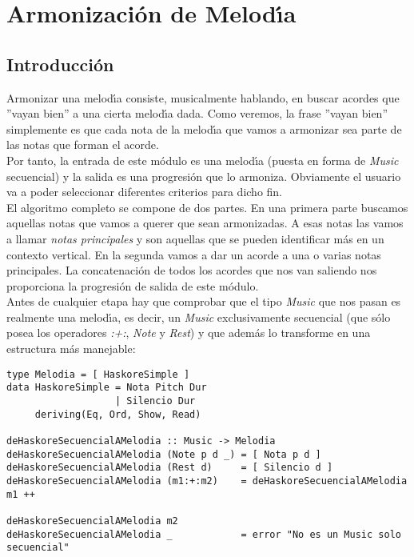 \chapter{Armonizaci\'on de Melod\'\i a}

\section{Introducci\'on}
Armonizar una melod\'\i a consiste, musicalmente hablando, en buscar
acordes que ''vayan bien'' a una cierta melod\'\i a dada. Como
veremos, la frase ''vayan bien'' simplemente es que cada nota
de la melod\'\i a que vamos a armonizar sea parte de las notas que forman el
acorde.\\
Por tanto, la entrada de este m\'odulo es una melod\'\i a (puesta en forma
de \emph{Music} secuencial) y la salida es una progresi\'on que lo armoniza.
Obviamente el usuario va a poder seleccionar diferentes criterios para
dicho fin.\\
\indent El algoritmo completo se compone de dos partes. En una primera parte
buscamos aquellas notas que vamos a querer que sean armonizadas. A esas
notas las vamos a llamar \emph{notas principales} y son aquellas que se pueden identificar
m\'as en un contexto vertical. En la segunda 
vamos a dar un acorde a una o varias notas principales. La concatenaci\'on
de todos los acordes que nos van saliendo nos proporciona la progresi\'on de salida de este m\'odulo.\\
\indent Antes de cualquier etapa hay que comprobar que el tipo \emph{Music} que nos
pasan es realmente una melod\'\i a, es decir, un \emph{Music} exclusivamente 
secuencial (que s\'olo posea los operadores \emph{:+:}, \emph{Note} y \emph{Rest}) y que adem\'as
lo transforme en una estructura m\'as manejable:
\small
\begin{verbatim}
type Melodia = [ HaskoreSimple ]
data HaskoreSimple = Nota Pitch Dur
                   | Silencio Dur
     deriving(Eq, Ord, Show, Read)

deHaskoreSecuencialAMelodia :: Music -> Melodia
deHaskoreSecuencialAMelodia (Note p d _) = [ Nota p d ]
deHaskoreSecuencialAMelodia (Rest d)     = [ Silencio d ]
deHaskoreSecuencialAMelodia (m1:+:m2)    = deHaskoreSecuencialAMelodia m1 ++ 
                                                deHaskoreSecuencialAMelodia m2
deHaskoreSecuencialAMelodia _            = error "No es un Music solo secuencial"
\end{verbatim}
\normalsize

